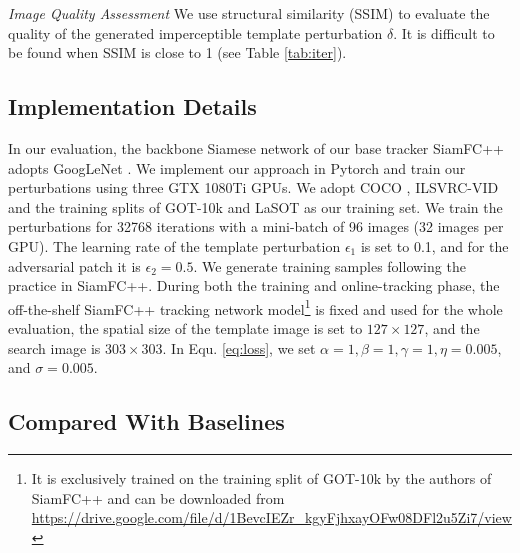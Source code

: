 \documentclass[journal]{IEEEtran}
\begin{document}
\textit{Image Quality Assessment} We use structural similarity (SSIM) \cite{SSIM} to evaluate the quality of the generated imperceptible template perturbation $\delta$. It is difficult to be found when SSIM is close to 1 (see Table \ref{tab:iter}).

\subsection{Implementation Details}

In our evaluation, the backbone Siamese network of our base tracker SiamFC++ \cite{SiamFC++} adopts GoogLeNet \cite{GoogLeNet}.
We implement our approach in Pytorch and train our perturbations using three GTX 1080Ti GPUs.
We adopt COCO \cite{COCO}, ILSVRC-VID \cite{VID} and the training splits of GOT-10k \cite{GOT-10k} and LaSOT \cite{LaSOT} as our training set.
We train the perturbations for 32768 iterations with a mini-batch of 96 images (32 images per GPU).
The learning rate of the template perturbation $\epsilon_1$ is set to 0.1, and for the adversarial patch it is $\epsilon_2 = 0.5$.
We generate training samples following the practice in SiamFC++.
During both the training and online-tracking phase, the off-the-shelf SiamFC++ tracking network model\footnote{It is exclusively trained on the training split of GOT-10k by the authors of SiamFC++ and can be downloaded from \url{https://drive.google.com/file/d/1BevcIEZr_kgyFjhxayOFw08DFl2u5Zi7/view}} is fixed and used for the whole evaluation, the spatial size of the template image is set to $127\times 127$, and the search image is $303\times 303$.
In Equ. \ref{eq:loss}, we set $\alpha=1, \beta=1, \gamma=1, \eta=0.005$, and $\sigma=0.005$.

\subsection{Compared With Baselines}
\end{document}
